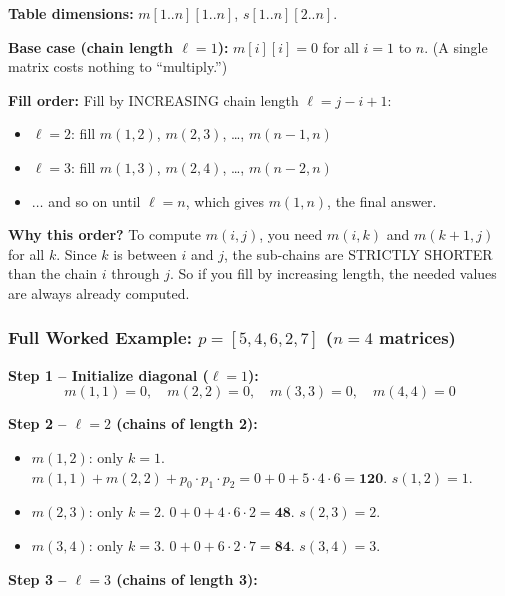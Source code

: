 \documentclass[12pt,portrait]{article}
\begin{document}
\begin{rulebox}
\textbf{Table dimensions:} $m[1..n][1..n]$, $s[1..n][2..n]$.

\textbf{Base case (chain length $\ell = 1$):} $m[i][i] = 0$ for all $i = 1$ to $n$. (A single matrix costs nothing to ``multiply.'')

\textbf{Fill order:} Fill by INCREASING chain length $\ell = j - i + 1$:
\begin{itemize}[leftmargin=*]
    \item $\ell = 2$: fill $m(1,2)$, $m(2,3)$, \ldots, $m(n-1,n)$
    \item $\ell = 3$: fill $m(1,3)$, $m(2,4)$, \ldots, $m(n-2,n)$
    \item $\ldots$ and so on until $\ell = n$, which gives $m(1,n)$, the final answer.
\end{itemize}

\textbf{Why this order?} To compute $m(i,j)$, you need $m(i,k)$ and $m(k+1,j)$ for all $k$. Since $k$ is between $i$ and $j$, the sub-chains are STRICTLY SHORTER than the chain $i$ through $j$. So if you fill by increasing length, the needed values are always already computed.
\end{rulebox}

\subsubsection{Full Worked Example: $p = [5, 4, 6, 2, 7]$ ($n=4$ matrices)}

\textbf{Step 1 -- Initialize diagonal ($\ell=1$):}
$$m(1,1)=0, \quad m(2,2)=0, \quad m(3,3)=0, \quad m(4,4)=0$$

\textbf{Step 2 -- $\ell=2$ (chains of length 2):}

\begin{itemize}[leftmargin=*]
    \item $m(1,2)$: only $k=1$. $m(1,1) + m(2,2) + p_0\cdot p_1\cdot p_2 = 0+0+5\cdot4\cdot6 = \mathbf{120}$. $s(1,2)=1$.
    \item $m(2,3)$: only $k=2$. $0+0+4\cdot6\cdot2 = \mathbf{48}$. $s(2,3)=2$.
    \item $m(3,4)$: only $k=3$. $0+0+6\cdot2\cdot7 = \mathbf{84}$. $s(3,4)=3$.
\end{itemize}

\textbf{Step 3 -- $\ell=3$ (chains of length 3):}
\end{document}
